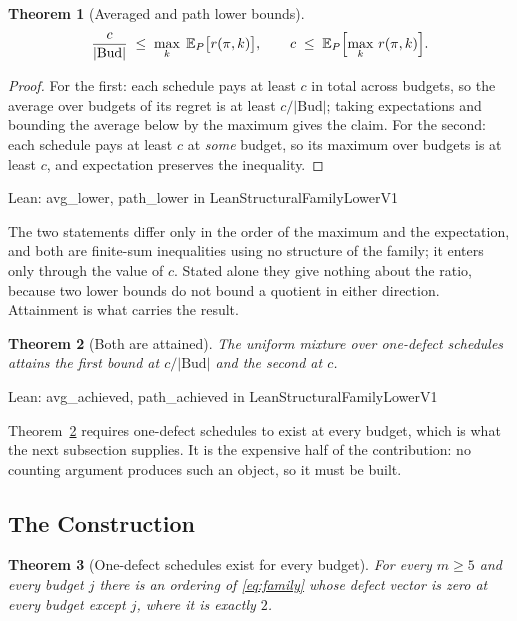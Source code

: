 \documentclass[conference]{IEEEtran}
\newtheorem{theorem}{Theorem}
\theoremstyle{definition}
\newcommand{\lean}[1]{\textsf{\footnotesize #1}}
\newcommand{\leanbox}[1]{%
  \par\vspace{2pt}\noindent
  {\footnotesize\textsf{Lean: #1}}\par\vspace{2pt}}
\begin{document}
\begin{theorem}[Averaged and path lower bounds]
\label{thm:bounds}
\begin{equation}
\frac{c}{|\mathrm{Bud}|}\;\leq\;\max_{k}\;\mathbb{E}_{P}\bigl[r(\pi,k)\bigr],
\qquad
c\;\leq\;\mathbb{E}_{P}\Bigl[\max_{k}\,r(\pi,k)\Bigr].
\label{eq:bounds}
\end{equation}
\end{theorem}

\begin{proof}
For the first: each schedule pays at least $c$ in total across budgets, so the average over
budgets of its regret is at least $c/|\mathrm{Bud}|$; taking expectations and bounding the
average below by the maximum gives the claim. For the second: each schedule pays at least $c$
at \emph{some} budget, so its maximum over budgets is at least $c$, and expectation preserves
the inequality.
\end{proof}

\leanbox{\lean{avg\_lower}, \lean{path\_lower} in \lean{LeanStructuralFamilyLowerV1}}

The two statements differ only in the order of the maximum and the expectation, and both are
finite-sum inequalities using no structure of the family; it enters only through the value of
$c$. Stated alone they give nothing about the ratio, because two lower bounds do not bound a
quotient in either direction. Attainment is what carries the result.

\begin{theorem}[Both are attained]
\label{thm:attained}
The uniform mixture over one-defect schedules attains the first bound at $c/|\mathrm{Bud}|$
and the second at $c$.
\end{theorem}

\leanbox{\lean{avg\_achieved}, \lean{path\_achieved} in
\lean{LeanStructuralFamilyLowerV1}}

Theorem~\ref{thm:attained} requires one-defect schedules to exist at every budget, which is
what the next subsection supplies. It is the expensive half of the contribution: no counting
argument produces such an object, so it must be built.

\subsection{The Construction}
\label{sec:construction}

\begin{theorem}[One-defect schedules exist for every budget]
\label{thm:construction}
For every $m\ge5$ and every budget $j$ there is an ordering of \eqref{eq:family} whose defect
vector is zero at every budget except $j$, where it is exactly $2$.
\end{theorem}
\end{document}
